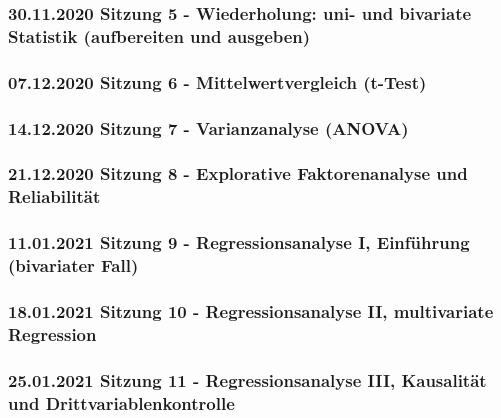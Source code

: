 \documentclass[
]{article}
\begin{document}
\hypertarget{sitzung-5---wiederholung-uni--und-bivariate-statistik-aufbereiten-und-ausgeben}{%
\subsubsection{30.11.2020 Sitzung 5 - Wiederholung: uni- und bivariate
Statistik (aufbereiten und
ausgeben)}\label{sitzung-5---wiederholung-uni--und-bivariate-statistik-aufbereiten-und-ausgeben}}

\hypertarget{sitzung-6---mittelwertvergleich-t-test}{%
\subsubsection{07.12.2020 Sitzung 6 - Mittelwertvergleich
(t-Test)}\label{sitzung-6---mittelwertvergleich-t-test}}

\hypertarget{sitzung-7---varianzanalyse-anova}{%
\subsubsection{14.12.2020 Sitzung 7 - Varianzanalyse
(ANOVA)}\label{sitzung-7---varianzanalyse-anova}}

\hypertarget{sitzung-8---explorative-faktorenanalyse-und-reliabilituxe4t}{%
\subsubsection{21.12.2020 Sitzung 8 - Explorative Faktorenanalyse und
Reliabilität}\label{sitzung-8---explorative-faktorenanalyse-und-reliabilituxe4t}}

\hypertarget{sitzung-9---regressionsanalyse-i-einfuxfchrung-bivariater-fall}{%
\subsubsection{11.01.2021 Sitzung 9 - Regressionsanalyse I, Einführung
(bivariater
Fall)}\label{sitzung-9---regressionsanalyse-i-einfuxfchrung-bivariater-fall}}

\hypertarget{sitzung-10---regressionsanalyse-ii-multivariate-regression}{%
\subsubsection{18.01.2021 Sitzung 10 - Regressionsanalyse II,
multivariate
Regression}\label{sitzung-10---regressionsanalyse-ii-multivariate-regression}}

\hypertarget{sitzung-11---regressionsanalyse-iii-kausalituxe4t-und-drittvariablenkontrolle}{%
\subsubsection{25.01.2021 Sitzung 11 - Regressionsanalyse III,
Kausalität und
Drittvariablenkontrolle}\label{sitzung-11---regressionsanalyse-iii-kausalituxe4t-und-drittvariablenkontrolle}}
\end{document}

